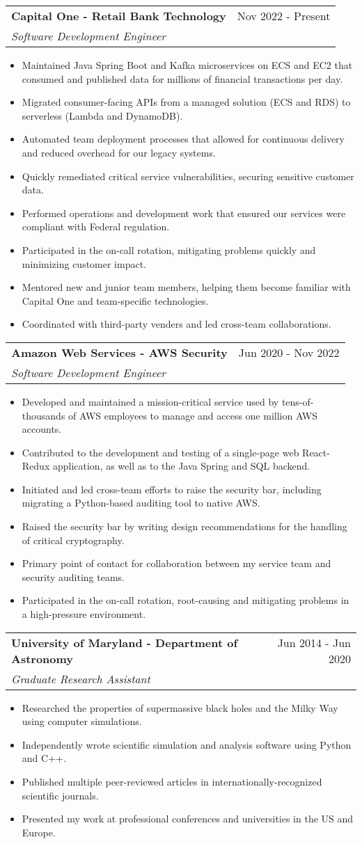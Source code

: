\documentclass[letterpaper,11pt]{article}
\makeatletter
\newlength{\outerbordwidth}
\newcommand{\resitem}[1]{\item #1 \vspace{-4pt}}
\newcommand{\resheading}[1]{\vspace{1pt}
  \parbox{\textwidth}{\setlength{\FrameSep}{\outerbordwidth}
    \begin{shaded}
\setlength{\fboxsep}{0pt}\framebox[\textwidth][l]{\setlength{\fboxsep}{4pt}\fcolorbox{shadecolorB}{shadecolorB}{\textbf{\sffamily{\mbox{~}\makebox[7.25in][l]{\large #1} \vphantom{p\^{E}}}}}}
    \end{shaded}
  }\vspace{-5pt}
}
\newcommand{\ressubheading}[4]{
\begin{tabular*}{7.5in}{l@{\cftdotfill{\cftsecdotsep}\extracolsep{\fill}}r}
		\textbf{#1} & #2 \\
		\textit{#3} & \textit{#4} \\
\end{tabular*}\vspace{-6pt}}
\makeatother
\begin{document}
\resheading{Work Experience}
\ressubheading{Capital One - Retail Bank Technology}{Nov 2022 - Present}{Software Development Engineer}{}
\begin{itemize}
	\resitem{Maintained Java Spring Boot and Kafka microservices on ECS and EC2 that consumed and published data for millions of financial transactions per day.}
	\resitem{Migrated consumer-facing APIs from a managed solution (ECS and RDS) to serverless (Lambda and DynamoDB).}
	\resitem{Automated team deployment processes that allowed for continuous delivery and reduced overhead for our legacy systems.}
	\resitem{Quickly remediated critical service vulnerabilities, securing sensitive customer data.}
	\resitem{Performed operations and development work that ensured our services were compliant with Federal regulation.}
	\resitem{Participated in the on-call rotation, mitigating problems quickly and minimizing customer impact.}
	\resitem{Mentored new and junior team members, helping them become familiar with Capital One and team-specific technologies.}
	\resitem{Coordinated with third-party venders and led cross-team collaborations.}
\end{itemize}
\ressubheading{Amazon Web Services - AWS Security}{Jun 2020 - Nov 2022}{Software Development Engineer}{}
\begin{itemize}
	\resitem{Developed and maintained a mission-critical service used by tens-of-thousands of AWS employees to manage and access one million AWS accounts.}
	\resitem{Contributed to the development and testing of a single-page web React-Redux application, as well as to the Java Spring and SQL backend.}
	\resitem{Initiated and led cross-team efforts to raise the security bar, including migrating a Python-based auditing tool to native AWS.}
	\resitem{Raised the security bar by writing design recommendations for the handling of critical cryptography.}
	\resitem{Primary point of contact for collaboration between my service team and security auditing teams.}
	\resitem{Participated in the on-call rotation, root-causing and mitigating problems in a high-pressure environment.}
\end{itemize}
\ressubheading{University of Maryland - Department of Astronomy}{Jun 2014 - Jun 2020}{Graduate Research Assistant}{}
\begin{itemize}
	\resitem{Researched the properties of supermassive black holes and the Milky Way using computer simulations.}
	\resitem{Independently wrote scientific simulation and analysis software using Python and C++.}
	\resitem{Published multiple peer-reviewed articles in internationally-recognized scientific journals.}
	\resitem{Presented my work at professional conferences and universities in the US and Europe.}
\end{itemize}
\end{document}
